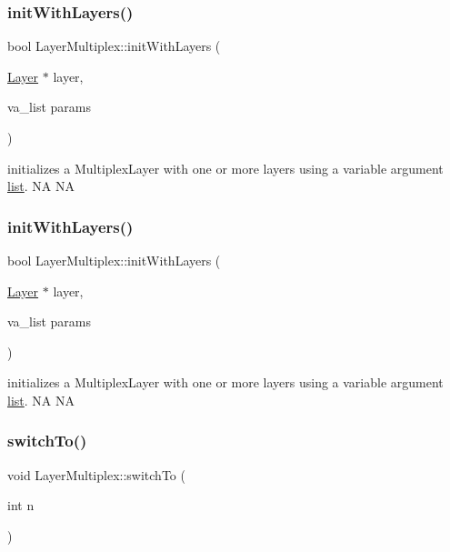 \subsubsection{\texorpdfstring{init\+With\+Layers()}{initWithLayers()}\hspace{0.1cm}{\footnotesize\ttfamily [1/2]}}
{\footnotesize\ttfamily bool Layer\+Multiplex\+::init\+With\+Layers (\begin{DoxyParamCaption}\item[{\hyperlink{classLayer}{Layer} $\ast$}]{layer,  }\item[{va\+\_\+list}]{params }\end{DoxyParamCaption})}

initializes a Multiplex\+Layer with one or more layers using a variable argument \hyperlink{protocollist-p}{list}.  NA  NA \mbox{\label{classLayerMultiplex_a9ad4fc1963d1a2a8fd1a41518e2c469b}} 
\subsubsection{\texorpdfstring{init\+With\+Layers()}{initWithLayers()}\hspace{0.1cm}{\footnotesize\ttfamily [2/2]}}
{\footnotesize\ttfamily bool Layer\+Multiplex\+::init\+With\+Layers (\begin{DoxyParamCaption}\item[{\hyperlink{classLayer}{Layer} $\ast$}]{layer,  }\item[{va\+\_\+list}]{params }\end{DoxyParamCaption})}

initializes a Multiplex\+Layer with one or more layers using a variable argument \hyperlink{protocollist-p}{list}.  NA  NA \mbox{\label{classLayerMultiplex_a2c9ab67b2b94e447a92d94fb28d45f89}} 
\subsubsection{\texorpdfstring{switch\+To()}{switchTo()}\hspace{0.1cm}{\footnotesize\ttfamily [1/3]}}
{\footnotesize\ttfamily void Layer\+Multiplex\+::switch\+To (\begin{DoxyParamCaption}\item[{int}]{n }\end{DoxyParamCaption})}

